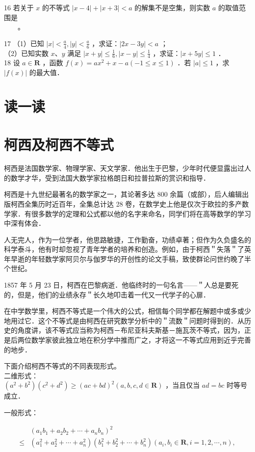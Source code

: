 \documentclass[10pt]{article}
\begin{document}
16 若关于 \(x\) 的不等式 \(|x-4|+|x+3|<a\) 的解集不是空集，则实数 \(a\) 的取值范围是\\
\(\qquad\)。

17 （1）已知 \(|x|<\frac{a}{4},|y|<\frac{a}{6}\) ，求证：\(|2 x-3 y|<a\) ；\\
（2）已知实数 \(x 、 y\) 满足 \(|x+y| \leqslant \frac{1}{6},|x-y| \leqslant \frac{1}{4}\) ，求证：\(|x+5 y| \leqslant 1\) ．\\
18 设 \(a \in \mathbf{R}\) ，函数 \(f(x)=a x^{2}+x-a(-1 \leqslant x \leqslant 1)\) ．若 \(|a| \leqslant 1\) ，求 \(|f(x)|\) 的最大值．

\section*{读一读}
\section*{柯西及柯西不等式}
柯西是法国数学家、物理学家、天文学家．他出生于巴黎，少年时代便显露出过人的数学才华，受到法国大数学家拉格朗日和拉普拉斯的赏识和指导．

柯西是十九世纪最著名的数学家之一，其论著多达 800 余篇（或部），后人编辑出版柯西全集历时近百年，全集总计达 28 卷，在数学史上他是仅次于欧拉的多产数学家．有很多数学的定理和公式都以他的名字来命名，同学们将在高等数学的学习中深有体会．

人无完人，作为一位学者，他思路敏捷，工作勤奋，功绩卓著；但作为久负盛名的科学泰斗，他有时却忽视了青年学者的培养和创造。例如，由于柯西＂失落＂了英年早逝的年轻数学家阿贝尔与伽罗华的开创性的论文手稿，致使群论问世约晚了半个世纪。

1857 年 5 月 23 日，柯西在巴黎病逝．他临终时的一句名言——＂人总是要死的，但是，他们的业绩永存＂长久地叩击着一代又一代学子的心扉．

在中学数学里，柯西不等式是一个伟大的公式，相信每个同学都在解题中或多或少地用过它．这个不等式是由柯西在研究数学分析中的＂流数＂问题时得到的．从历史的角度讲，该不等式应当称为柯西－布尼亚科夫斯基－施瓦茨不等式，因为，正是后两位数学家彼此独立地在积分学中推而广之，才将这一不等式应用到近乎完善的地步．

下面介绍柯西不等式的不同表现形式。\\
二维形式：\\
\(\left(a^{2}+b^{2}\right)\left(c^{2}+d^{2}\right) \geqslant(a c+b d)^{2}(a, b, c, d \in \mathbf{R})\) ，当且仅当 \(a d=b c\) 时等号成立．

一般形式：

\[
\begin{aligned}
& \left(a_{1} b_{1}+a_{2} b_{2}+\cdots+a_{n} b_{n}\right)^{2} \\
\leqslant & \left(a_{1}^{2}+a_{2}^{2}+\cdots+a_{n}^{2}\right)\left(b_{1}^{2}+b_{2}^{2}+\cdots+b_{n}^{2}\right)\left(a_{i}, b_{i} \in \mathbf{R}, i=1,2, \cdots, n\right),
\end{aligned}
\]
\end{document}
